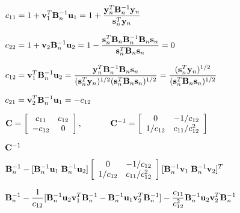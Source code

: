 \documentclass{article}
\def\lthtmlcheckvsize{\ifdim\ht\sizebox<\vsize 
  \ifdim\wd\sizebox<\hsize\expandafter\hfill\fi \expandafter\vfill
  \else\expandafter\vss\fi}%
\begin{document}
{\newpage\clearpage
{}%
$\displaystyle c_{11}=1+{\bf v}^T_1{\bf B}_n^{-1}{\bf u}_1
=1+\frac{{\bf y}^T_n{\bf B}_n^{-1}{\bf y}_n}{{\bf s}_n^T{\bf y}_n}$%
\lthtmlindisplaymathZ
\lthtmlcheckvsize\clearpage}

{\newpage\clearpage
{}%
$\displaystyle c_{22}=1+{\bf v}_2{\bf B}_n^{-1}{\bf u}_2
=1-\frac{{\bf s}_n^T{\bf B}_n{\bf B}_n^{-1}{\bf B}_n{\bf s}_n}{{\bf s}_n^T{\bf B}_n{\bf s}_n}
=0$%
\lthtmlindisplaymathZ
\lthtmlcheckvsize\clearpage}

{\newpage\clearpage
{}%
$\displaystyle c_{12}={\bf v}_1^T{\bf B}_n^{-1}{\bf u}_2
=\frac{{\bf y}_n^T{\bf B}_n^{-1}{\bf B}_n{\bf s}_n}
{ ({\bf s}_n^T{\bf y}_n)^{1/2} ({\bf s}_n^T{\bf B}_n{\bf s}_n)^{1/2} }
=\frac{({\bf s}_n^T{\bf y}_n)^{1/2}}{({\bf s}_n^T{\bf B}_n{\bf s}_n)^{1/2} }$%
\lthtmlindisplaymathZ
\lthtmlcheckvsize\clearpage}

{\newpage\clearpage
{}%
$\displaystyle c_{21}={\bf v}_2^T{\bf B}_n^{-1}{\bf u}_1=-c_{12}$%
\lthtmlindisplaymathZ
\lthtmlcheckvsize\clearpage}

{\newpage\clearpage
{}%
$\displaystyle {\bf C}=\left[\begin{array}{cc}c_{11} & c_{12}\\-c_{12} & 0\end{array}\right],
\;\;\;\;\;\;\;\;\;\;\;\;
{\bf C}^{-1}=
\left[\begin{array}{cc}0 & -1/c_{12}\\1/c_{12} & c_{11}/c_{12}^2\end{array}\right]$%
\lthtmlindisplaymathZ
\lthtmlcheckvsize\clearpage}

{\newpage\clearpage
{}%
$ {\bf C}^{-1}$%
\lthtmlindisplaymathZ
\lthtmlcheckvsize\clearpage}

{\newpage\clearpage
{}%
$\displaystyle {\bf B}_n^{-1}-[{\bf B}_n^{-1}{\bf u}_1\;{\bf B}_n^{-1}{\bf u}_2]
\left[\begin{array}{cc}0 & -1/c_{12}\\1/c_{12} & c_{11}/c_{12}^2\end{array}\right]
[{\bf B}_n^{-1}{\bf v}_1\;{\bf B}_n^{-1}{\bf v}_2]^T$%
\lthtmlindisplaymathZ
\lthtmlcheckvsize\clearpage}

{\newpage\clearpage
{}%
$\displaystyle {\bf B}_n^{-1}-\frac{1}{c_{12}}
[{\bf B}_n^{-1}{\bf u}_2{\bf v}_1^T{\bf B}_n^{-1}
-{\bf B}_n^{-1}{\bf u}_1{\bf v}_2^T{\bf B}_n^{-1}]
-\frac{c_{11}}{c_{12}^2}{\bf B}_n^{-1}{\bf u}_2{\bf v}_2^T{\bf B}_n^{-1}$%
\lthtmlindisplaymathZ
\lthtmlcheckvsize\clearpage}
\end{document}
